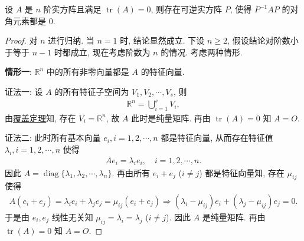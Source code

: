 \documentclass[../../main.tex]{subfiles}%
\begin{document}
\begin{proposition}\label{proposition:迹0阵必相似于主对角全0阵}
设 $A$ 是 $n$ 阶实方阵且满足 $\operatorname{tr}(A)=0$, 则存在可逆实方阵 $P$, 使得 $P^{-1}AP$ 的对角元素都是 $0$.
\end{proposition}
\begin{proof}
对 $n$ 进行归纳. 当 $n=1$ 时, 结论显然成立. 下设 $n\geqslant 2$, 假设结论对阶数小于等于 $n-1$ 时都成立, 现在考虑阶数为 $n$ 的情况. 考虑两种情形.

\textbf{情形一}: $\mathbb{R}^n$ 中的所有非零向量都是 $A$ 的特征向量.

{\color{blue}证法一:} 设 $A$ 的所有特征子空间为 $V_1,V_2,\cdots,V_s$, 则
\begin{align*}
\mathbb{R}^n = \bigcup_{i=1}^s V_i,
\end{align*}
由\hyperref[theorem:覆盖定理]{覆盖定理}知, 存在 $V_i=\mathbb{R}^n$, 故 $A$ 此时是纯量矩阵. 再由 $\operatorname{tr}(A)=0$ 知 $A=O$.

{\color{blue}证法二:} 此时所有基本向量 $e_i,i=1,2,\cdots,n$ 都是特征向量, 从而存在特征值 $\lambda_i,i=1,2,\cdots,n$ 使得
\begin{align*}
Ae_i = \lambda_i e_i,\quad i=1,2,\cdots,n.
\end{align*}
因此 $A=\operatorname{diag}\{\lambda_1,\lambda_2,\cdots,\lambda_n\}$. 再由所有 $e_i+e_j$ ($i\ne j$) 都是特征向量知, 存在 $\mu_{ij}$ 使得
\begin{align*}
A(e_i+e_j) = \lambda_i e_i + \lambda_j e_j = \mu_{ij}(e_i+e_j)
\Longrightarrow (\lambda_i-\mu_{ij})e_i + (\lambda_j-\mu_{ij})e_j = 0.
\end{align*}
于是由 $e_i,e_j$ 线性无关知 $\mu_{ij}=\lambda_i=\lambda_j$ ($i\ne j$). 因此 $A$ 是纯量矩阵. 再由 $\operatorname{tr}(A)=0$ 知 $A=O$.


\end{proof}
\end{document}

